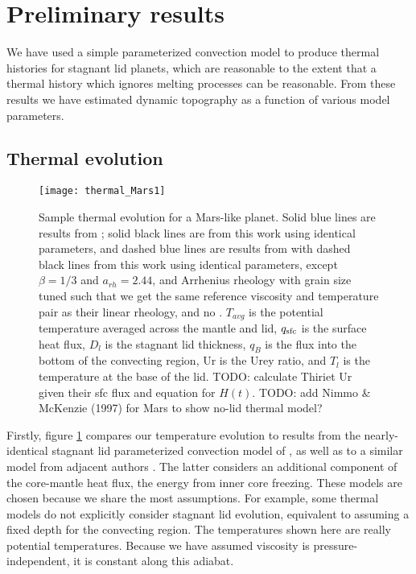 \section{Preliminary results}\label{sec:results}

We have used a simple parameterized convection model to produce thermal histories for stagnant lid planets, which are reasonable to the extent that a thermal history which ignores melting processes can be reasonable. From these results we have estimated dynamic topography as a function of various model parameters.

\subsection{Thermal evolution}

\begin{figure}
  \centering
  \texttt{[image: thermal\_Mars1]}
\caption{Sample thermal evolution for a Mars-like planet. Solid blue lines are results from \citet{Thiriet2019}; solid black lines are from this work using identical parameters, and dashed blue lines are results from \citet{Breuer2010} with dashed black lines from this work using identical parameters, except $\beta = 1/3$ and $a_{rh} = 2.44$, and Arrhenius rheology with grain size tuned such that we get the same reference viscosity and temperature pair as their linear rheology, and no . $T_{avg}$ is the potential temperature averaged across the mantle and lid, $q_{\rm sfc}$ is the surface heat flux, $D_l$ is the stagnant lid thickness, $q_{B}$ is the flux into the bottom of the convecting region, Ur is the Urey ratio, and $T_l$ is the temperature at the base of the lid. TODO: calculate Thiriet Ur given their sfc flux and equation for $H(t)$. TODO: add Nimmo \& McKenzie (1997) for Mars to show no-lid thermal model?}
\label{fig:thermal}
\end{figure}

Firstly, figure \ref{fig:thermal} compares our temperature evolution to results from the nearly-identical stagnant lid parameterized convection model of \citet{Thiriet2019}, as well as to a similar model from adjacent authors \citep{Breuer2010}. The latter considers an additional component of the core-mantle heat flux, the energy from inner core freezing. These models are chosen because we share the most assumptions. For example, some thermal models do not explicitly consider stagnant lid evolution, equivalent to assuming a fixed depth for the convecting region. The temperatures shown here are really potential temperatures. Because we have assumed viscosity is pressure-independent, it is constant along this adiabat.


